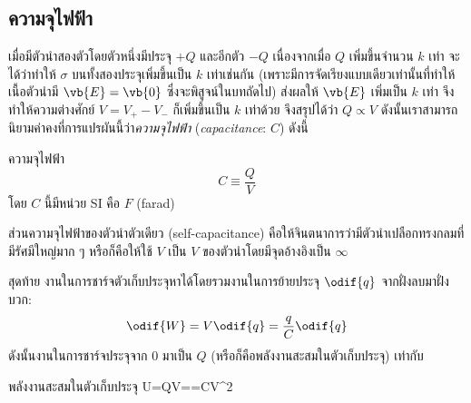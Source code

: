 \subsection{ความจุไฟฟ้า}
เมื่อมีตัวนำสองตัวโดยตัวหนึ่งมีประจุ $+Q$ และอีกตัว $-Q$ เนื่องจากเมื่อ $Q$ เพิ่มขึ้นจำนวน $k$ เท่า จะได้ว่าทำให้ $\sigma$ บนทั้งสองประจุเพิ่มขึ้นเป็น $k$ เท่าเช่นกัน (เพราะมีการจัดเรียงแบบเดียวเท่านั้นที่ทำให้เนื้อตัวนำมี $\vb{E}=\vb{0}$ ซึ่งจะพิสูจน์ในบทถัดไป) ส่งผลให้ $\vb{E}$ เพิ่มเป็น $k$ เท่า จึงทำให้ความต่างศักย์ $V=V_{+}-V_-$ ก็เพิ่มขึ้นเป็น $k$ เท่าด้วย จึงสรุปได้ว่า $Q\propto V$ ดังนั้นเราสามารถนิยามค่าคงที่การแปรผันนี้ว่า\emph{ความจุไฟฟ้า} (\emph{capacitance}: $C$) ดังนี้
\begin{defbox}{ความจุไฟฟ้า}
    \begin{equation*}
        C\equiv\frac{Q}{V}
    \end{equation*}
    โดย $C$ นี้มีหน่วย SI คือ $\unit{F}$ (farad)
\end{defbox}
ส่วนความจุไฟฟ้าของตัวนำตัวเดียว (self-capacitance) คือให้จินตนาการว่ามีตัวนำเปลือกทรงกลมที่มีรัศมีใหญ่มาก ๆ หรือก็คือให้ใช้ $V$ เป็น $V$ ของตัวนำโดยมีจุดอ้างอิงเป็น $\infty$

สุดท้าย งานในการชาร์จตัวเก็บประจุหาได้โดยรวมงานในการย้ายประจุ $\odif{q}$ จากฝั่งลบมาฝั่งบวก:
\[ 
\odif{W}=V\odif{q}=\frac{q}{C}\odif{q}
\]
ดังนั้นงานในการชาร์จประจุจาก $0$ มาเป็น $Q$ (หรือก็คือพลังงานสะสมในตัวเก็บประจุ) เท่ากับ
\begin{ieqbox}{พลังงานสะสมในตัวเก็บประจุ}
    U=QV==CV^2
\end{ieqbox}